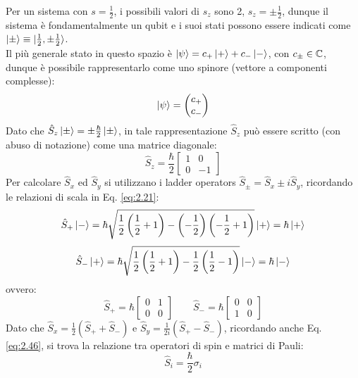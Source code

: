 Per un sistema con $ s = \frac{1}{2} $, i possibili valori di $ s_z $ sono 2, $ s_z = \pm \frac{1}{2} $, dunque il sistema è fondamentalmente un qubit e i suoi stati possono essere indicati come $ \ket{\pm} \equiv \ket{\frac{1}{2},\pm\frac{1}{2}} $.\\
Il più generale stato in questo spazio è $ \ket{\psi} = c_+ \ket{+} + c_- \ket{-} $, con $ c_{\pm}\in\mathbb{C} $, dunque è possibile rappresentarlo come uno spinore (vettore a componenti complesse):
\begin{equation}
	\ket{\psi} =
	\begin{pmatrix}
		c_+ \\ c_-
	\end{pmatrix}
	\label{eq:2.45}
\end{equation}
Dato che $ \hat{S}_z \ket{\pm} = \pm \frac{\hbar}{2} \ket{\pm} $, in tale rappresentazione $ \hat{S}_z $ può essere scritto (con abuso di notazione) come una matrice diagonale:
\begin{equation}
	\hat{S}_z = \frac{\hbar}{2}
	\begin{bmatrix}
		1 & 0 \\
		0 & -1
	\end{bmatrix}
	\label{eq:2.46}
\end{equation}
Per calcolare $ \hat{S}_x $ ed $ \hat{S}_y $ si utilizzano i ladder operators $ \hat{S}_{\pm} = \hat{S}_x \pm i \hat{S}_y $, ricordando le relazioni di scala in Eq. \ref{eq:2.21}:
\begin{equation*}
	\hat{S}_+ \ket{-} = \hbar \sqrt{\frac{1}{2} \left( \frac{1}{2} + 1 \right) - \left( - \frac{1}{2} \right) \left( - \frac{1}{2} + 1 \right)} \ket{+} = \hbar \ket{+}
\end{equation*}
\begin{equation*}
	\hat{S}_- \ket{+} = \hbar \sqrt{\frac{1}{2} \left( \frac{1}{2} + 1 \right) - \frac{1}{2} \left( \frac{1}{2} - 1 \right)} \ket{-} = \hbar \ket{-}
\end{equation*}
ovvero:
\begin{equation}
	\hat{S}_+ = \hbar
	\begin{bmatrix}
		0 & 1 \\
		0 & 0
	\end{bmatrix}
	\qquad
	\hat{S}_- = \hbar
	\begin{bmatrix}
		0 & 0 \\
		1 & 0
	\end{bmatrix}
	\label{eq:2.47}
\end{equation}
Dato che $ \hat{S}_x = \frac{1}{2} ( \hat{S}_+ + \hat{S}_- ) $ e $ \hat{S}_y = \frac{1}{2i} ( \hat{S}_+ - \hat{S}_- ) $, ricordando anche Eq. \ref{eq:2.46}, si trova la relazione tra operatori di spin e matrici di Pauli:
\begin{equation}
	\hat{S}_i = \frac{\hbar}{2} \sigma_i
	\label{eq:2.48}
\end{equation}

